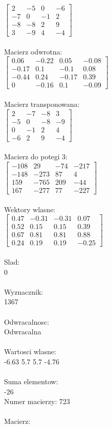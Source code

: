 \documentclass[a4paper,12pt]{article}
\begin{document}
$\begin{bmatrix} 2&-5&0&-6\\-7&0&-1&2\\-8&-8&2&9\\3&-9&4&-4 \end{bmatrix}$
\\
\\
Macierz odwrotna:\\

$\begin{bmatrix} 0.06&-0.22&0.05&-0.08\\-0.17&0.1&-0.1&0.08\\-0.44&0.24&-0.17&0.39\\0&-0.16&0.1&-0.09 \end{bmatrix}$
\\
\\
Macierz transponowana:\\

$\begin{bmatrix} 2&-7&-8&3\\-5&0&-8&-9\\0&-1&2&4\\-6&2&9&-4 \end{bmatrix}$
\\
\\
Macierz do potegi 3:\\

$\begin{bmatrix} -108&29&-74&-217\\-148&-273&87&4\\159&-765&209&-44\\167&-277&77&-227 \end{bmatrix}$
\\
\\
Wektory wlasne:\\

$\begin{bmatrix} 0.47&-0.31&-0.31&0.07\\0.52&0.15&0.15&0.39\\0.67&0.81&0.81&0.88\\0.24&0.19&0.19&-0.25 \end{bmatrix}$
\\
\\
Slad:\\
0
\\
\\
Wyznacznik:\\
1367
\\
\\
Odwracalnosc:\\
Odwracalna
\\
\\
Wartosci wlasne:\\
-6.63 5.7 5.7 -4.76
\\
\\
Suma elementow:\\
-26
\\
\newpage
Numer macierzy:
723
\\
\\
Macierz:\\
\end{document}
